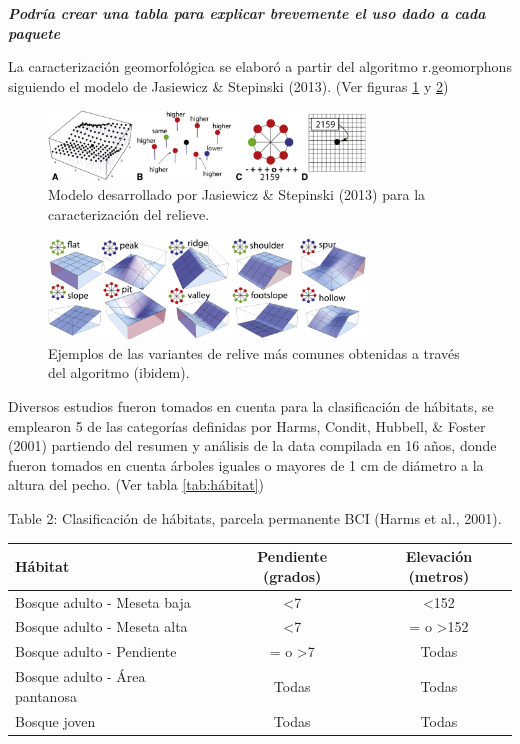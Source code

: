 \documentclass[11pt,]{article}
\begin{document}
\textbf{\emph{Podría crear una tabla para explicar brevemente el uso
dado a cada paquete}}

La caracterización geomorfológica se elaboró a partir del algoritmo
r.geomorphons siguiendo el modelo de Jasiewicz \& Stepinski (2013). (Ver
figuras \ref{Geomorf3} y \ref{Geomorf2})

\begin{figure}
\centering
\includegraphics[width=0.75000\textwidth]{Geomorf3.png}
\caption{Modelo desarrollado por Jasiewicz \& Stepinski (2013) para la
caracterización del relieve.\label{Geomorf3}}
\end{figure}

\begin{figure}
\centering
\includegraphics[width=0.75000\textwidth]{Geomor2.png}
\caption{Ejemplos de las variantes de relive más comunes obtenidas a
través del algoritmo (ibidem).\label{Geomorf2}}
\end{figure}

Diversos estudios fueron tomados en cuenta para la clasificación de
hábitats, se emplearon 5 de las categorías definidas por Harms, Condit,
Hubbell, \& Foster (2001) partiendo del resumen y análisis de la data
compilada en 16 años, donde fueron tomados en cuenta árboles iguales o
mayores de 1 cm de diámetro a la altura del pecho. (Ver tabla
\ref{tab:hábitat})

Table 2: Clasificación de hábitats, parcela permanente BCI (Harms et
al., 2001).\label{tab:hábitat}

\begin{longtable}[]{@{}lcc@{}}
\toprule
Hábitat & Pendiente (grados) & Elevación (metros)\tabularnewline
\midrule
\endhead
Bosque adulto - Meseta baja & \textless{}7 &
\textless{}152\tabularnewline
Bosque adulto - Meseta alta & \textless{}7 & = o
\textgreater{}152\tabularnewline
Bosque adulto - Pendiente & = o \textgreater{}7 & Todas\tabularnewline
Bosque adulto - Área pantanosa & Todas & Todas\tabularnewline
Bosque joven & Todas & Todas\tabularnewline
\bottomrule
\end{longtable}
\end{document}
